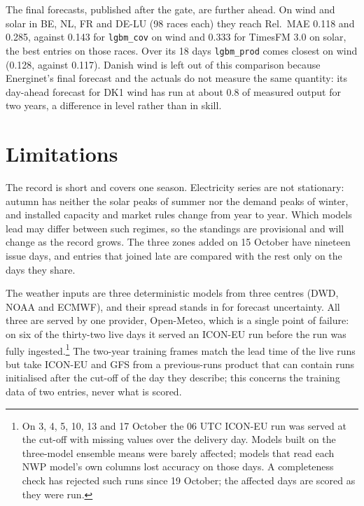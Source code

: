 \documentclass[11pt,a4paper]{article}
\newcommand{\m}[1]{\texttt{#1}}
\begin{document}
The final forecasts, published after the gate, are further ahead. On wind and solar in BE, NL, FR and DE-LU (98 races
each) they reach Rel.\ MAE 0.118 and 0.285, against 0.143 for \m{lgbm\_cov} on wind and 0.333 for TimesFM 3.0 on solar,
the best entries on those races. Over its 18 days \m{lgbm\_prod} comes closest on wind (0.128, against 0.117). Danish
wind is left out of this comparison because Energinet's final forecast and the actuals do not measure the same
quantity: its day-ahead forecast for DK1 wind has run at about 0.8 of measured output for two years, a difference in
level rather than in skill.

\section{Limitations}
\label{sec:limits}

The record is short and covers one season. Electricity series are not stationary: autumn has neither the solar peaks of summer nor
the demand peaks of winter, and installed capacity and market rules
change from year to year. Which models lead may differ between such regimes, so the standings are provisional and
will change as the record grows. The three zones added on 15 October have nineteen issue days, and entries that
joined late are compared with the rest only on the days they share.

The weather inputs are three deterministic models from three centres (DWD, NOAA and ECMWF), and their spread stands
in for forecast uncertainty. All three are served by one provider, Open-Meteo, which is a single point of failure: on
six of the thirty-two live days it served an ICON-EU run before the run was fully ingested.\footnote{On 3, 4, 5, 10, 13
and 17 October the 06 UTC ICON-EU run was served at the cut-off with missing values over the delivery day. Models
built on the three-model ensemble means were barely affected; models that read each NWP model's own columns lost
accuracy on those days. A completeness check has rejected such runs since 19 October; the affected days are scored as
they were run.} The two-year training frames match the lead time of the live runs but take ICON-EU and GFS from a
previous-runs product that can contain runs initialised after the cut-off of the day they describe; this concerns
the training data of two entries, never what is scored.
\end{document}
